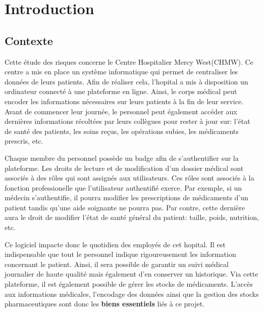 \documentclass[12pt]{article}
\begin{document}
\newpage
\renewcommand{\contentsname}{Table des matières}
\tableofcontents
\newpage

\section{Introduction} 

\subsection{Contexte}

\justify
Cette étude des risques concerne le Centre Hospitalier Mercy West(CHMW). Ce centre a mis en place un système informatique qui permet de centraliser les données de leurs patients. Afin de réaliser cela, l'hopital a mis à disposition un ordinateur connecté à une plateforme en ligne. Ainsi, le corps médical peut encoder les informations nécessaires sur leurs patients à la fin de leur service. Avant de commencer leur journée, le personnel peut également accéder aux dernières informations récoltées par leurs collègues pour rester à jour sur: l'état de santé des patients, les soins reçus, les opérations subies, les médicaments prescris, etc.

\justify
Chaque membre du personnel possède un badge afin de s'authentifier sur la plateforme. Les droits de lecture et de modification d'un dossier médical sont associés à des rôles qui sont assignés aux utilisateurs.  Ces rôles sont associés à la fonction professionelle que l'utilisateur authentifié exerce. Par exemple, si un médecin s'authentifie, il pourra modifier les prescriptions de médicaments d'un patient tandis qu'une aide soignante ne pourra pas. Par contre, cette dernière aura le droit de modifier l'état de santé général du patient: taille, poids, nutrition, etc.

\justify
Ce logiciel impacte donc le quotidien des employés de cet hopital. Il est indispensable que tout le personnel indique rigoureusement les information concernant le patient. Ainsi, il sera possible de garantir un suivi médical journalier de haute qualité mais également d'en conserver un historique. Via cette plateforme, il est également possible de gérer les stocks de médicaments. L'accès aux informations médicales, l'encodage des données ainsi que la gestion des stocks pharmaceutiques sont donc les \textbf{biens essentiels} liés à ce projet. 
\end{document}
